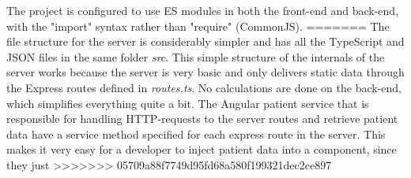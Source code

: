 \documentclass[10pt,a4paper]{article}
\begin{document}
The project is configured to use ES modules in both the front-end and back-end, with the "import" syntax rather than "require" (CommonJS). 
=======
The file structure for the server is considerably simpler and has all the TypeScript and JSON files in the same folder \textit{src}. This simple structure of the internals of the server works because the server is very basic and only delivers static data through the Express routes defined in \textit{routes.ts}. No calculations are done on the back-end, which simplifies everything quite a bit. The Angular patient service that is responsible for handling HTTP-requests to the server routes and retrieve patient data have a service method specified for each express route in the server. This makes it very easy for a developer to inject patient data into a component, since they just 
>>>>>>> 05709a88f7749d95fd68a580f199321dec2ce897


\end{document}
